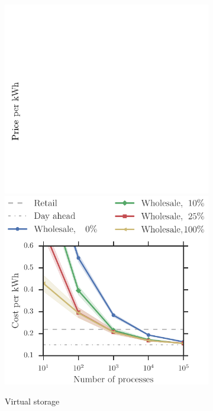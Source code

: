 \documentclass[conference]{IEEEtran}
\begin{document}
\begin{figure}[t!]
\begin{subfigure}[b]{0.32\textwidth}
	\includegraphics[scale=0.7,clip=true, trim=0.3cm 0.0cm 8.7cm 3cm]{figures/ylabel.pdf}
	\includegraphics[width=1.0\textwidth, clip=true, trim=0.8cm 0 0 2cm]{figures/Wholesale.pdf}
        \caption{Virtual storage}
        \label{fig:wholesale}
    \end{subfigure}
   	\begin{subfigure}[b]{0.32\textwidth}

\end{subfigure}
\end{figure}
\end{document}
